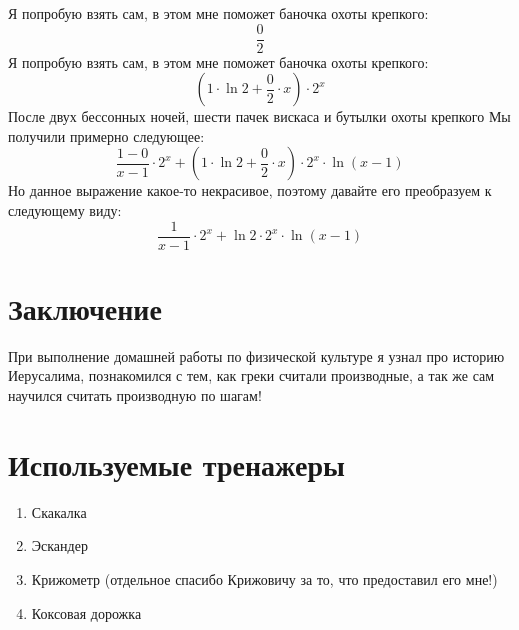 \documentclass[a4paper,12pt]{article}
\begin{document}
Я попробую взять сам, в этом мне поможет баночка охоты крепкого:
\begin{equation}
\frac{0}{2} 
\end{equation} 
Я попробую взять сам, в этом мне поможет баночка охоты крепкого:
\begin{equation}
\left(1 \cdot \ln2+\frac{0}{2}  \cdot x\right) \cdot 2^{x} 
\end{equation} 
После двух бессонных ночей, шести пачек вискаса и бутылки охоты крепкого Мы получили примерно следующее:
\begin{equation}
\frac{1-0}{x-1}  \cdot 2^{x} +\left(1 \cdot \ln2+\frac{0}{2}  \cdot x\right) \cdot 2^{x}  \cdot \ln(x-1) 
\end{equation} 
Но данное выражение какое-то некрасивое, поэтому давайте его преобразуем к следующему виду:
\begin{equation}
\frac{1}{x-1}  \cdot 2^{x} +\ln2 \cdot 2^{x}  \cdot \ln(x-1) 
\end{equation} 
\section{Заключение}
 При выполнение домашней работы по физической культуре я узнал про историю Иерусалима, познакомился с тем, как греки считали производные, а так же сам научился считать производную по шагам!
\section{Используемые тренажеры}
 \begin{enumerate}
 \item Скакалка
 \item Эскандер
 \item Крижометр (отдельное спасибо Крижовичу за то, что предоставил его мне!)
 \item Коксовая дорожка
 \end{enumerate}
\end{document}
